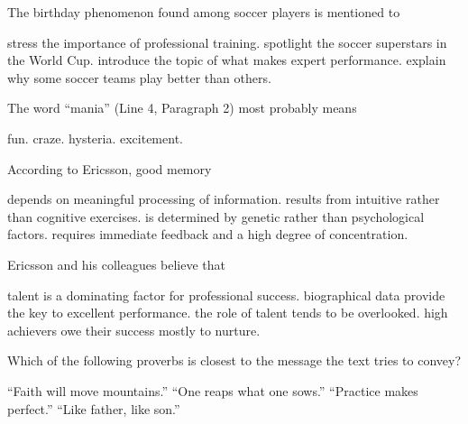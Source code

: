 \item The birthday phenomenon found among soccer players is mentioned to
\begin{tasks}
	\task stress the importance of professional training.
	\task spotlight the soccer superstars in the World Cup.
	\task introduce the topic of what makes expert performance.
	\task explain why some soccer teams play better than others.
\end{tasks}
\item The word ``mania'' (Line 4, Paragraph 2) most probably means
\begin{tasks}
	\task fun.
	\task craze.
	\task hysteria.
	\task excitement.
\end{tasks}
\item According to Ericsson, good memory
\begin{tasks}
	\task depends on meaningful processing of information.
	\task results from intuitive rather than cognitive exercises.
	\task is determined by genetic rather than psychological factors.
	\task requires immediate feedback and a high degree of concentration.
\end{tasks}
\item Ericsson and his colleagues believe that
\begin{tasks}
	\task talent is a dominating factor for professional success.
	\task biographical data provide the key to excellent performance.
	\task the role of talent tends to be overlooked.
	\task high achievers owe their success mostly to nurture.
\end{tasks}
\item Which of the following proverbs is closest to the message the text tries to convey?
\begin{tasks}
	\task ``Faith will move mountains.''
	\task ``One reaps what one sows.''
	\task ``Practice makes perfect.''
	\task ``Like father, like son.''
\end{tasks}